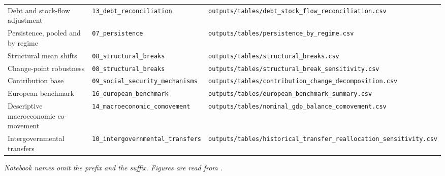 \documentclass[11pt,a4paper]{article}
\begin{document}
\begin{table}[htbp]
{\begin{tabular}{@{}lll@{}}
Debt and stock-flow adjustment & \texttt{13\_debt\_reconciliation} & \texttt{outputs/tables/debt\_stock\_flow\_reconciliation.csv} \\
Persistence, pooled and by regime & \texttt{07\_persistence} & \texttt{outputs/tables/persistence\_by\_regime.csv} \\
Structural mean shifts & \texttt{08\_structural\_breaks} & \texttt{outputs/tables/structural\_breaks.csv} \\
Change-point robustness & \texttt{08\_structural\_breaks} & \texttt{outputs/tables/structural\_break\_sensitivity.csv} \\
Contribution base & \texttt{09\_social\_security\_mechanisms} & \texttt{outputs/tables/contribution\_change\_decomposition.csv} \\
European benchmark & \texttt{16\_european\_benchmark} & \texttt{outputs/tables/european\_benchmark\_summary.csv} \\
Descriptive macroeconomic co-movement & \texttt{14\_macroeconomic\_comovement} & \texttt{outputs/tables/nominal\_gdp\_balance\_comovement.csv} \\
Intergovernmental transfers & \texttt{10\_intergovernmental\_transfers} & \texttt{outputs/tables/historical\_transfer\_reallocation\_sensitivity.csv} \\
\bottomrule
\end{tabular}%
}
\par\smallskip
\begin{minipage}{\linewidth}\footnotesize\itshape Notebook names omit the  prefix and the  suffix. Figures are read from .\end{minipage}
\end{table}
\end{document}
